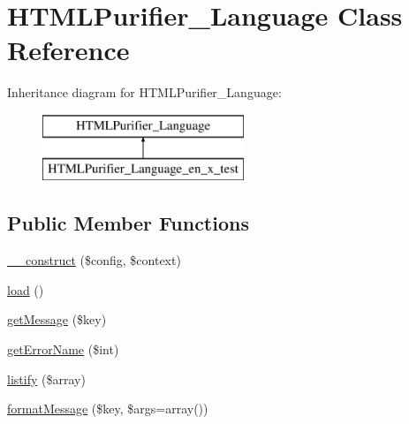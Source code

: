 \hypertarget{classHTMLPurifier__Language}{\section{H\+T\+M\+L\+Purifier\+\_\+\+Language Class Reference}
\label{classHTMLPurifier__Language}
}
Inheritance diagram for H\+T\+M\+L\+Purifier\+\_\+\+Language\+:\begin{figure}[H]
\begin{center}
\leavevmode
\includegraphics[height=2.000000cm]{classHTMLPurifier__Language}
\end{center}
\end{figure}
\subsection*{Public Member Functions}
\begin{DoxyCompactItemize}
\item 
\hyperlink{classHTMLPurifier__Language_ae967a044aeccf40e1a720b42974e8486}{\+\_\+\+\_\+construct} (\$config, \$context)
\item 
\hyperlink{classHTMLPurifier__Language_ae63620b94eeef941c32b09c81aafae0f}{load} ()
\item 
\hyperlink{classHTMLPurifier__Language_a87e3e641f0107e627763704a2d0e35d2}{get\+Message} (\$key)
\item 
\hyperlink{classHTMLPurifier__Language_a768ea5a9eb187163fe2a2fade98e09e5}{get\+Error\+Name} (\$int)
\item 
\hyperlink{classHTMLPurifier__Language_aa4fbc716f45b1c395cb440d32d3e13cd}{listify} (\$array)
\item 
\hyperlink{classHTMLPurifier__Language_a50e09a143464f808615cf1db550f033c}{format\+Message} (\$key, \$args=array())
\end{DoxyCompactItemize}
